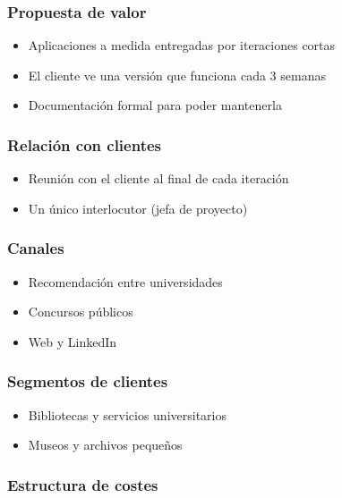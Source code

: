 \subsubsection*{Propuesta de valor}

\begin{itemize}
\item Aplicaciones a medida entregadas por iteraciones cortas
\item El cliente ve una versión que funciona cada 3 semanas
\item Documentación formal para poder mantenerla
\end{itemize}

\subsubsection*{Relación con clientes}

\begin{itemize}
\item Reunión con el cliente al final de cada iteración
\item Un único interlocutor (jefa de proyecto)
\end{itemize}

\subsubsection*{Canales}

\begin{itemize}
\item Recomendación entre universidades
\item Concursos públicos
\item Web y LinkedIn
\end{itemize}

\subsubsection*{Segmentos de clientes}

\begin{itemize}
\item Bibliotecas y servicios universitarios
\item Museos y archivos pequeños
\end{itemize}

\subsubsection*{Estructura de costes}

